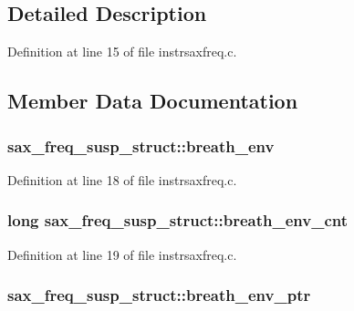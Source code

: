 \subsection{Detailed Description}


Definition at line 15 of file instrsaxfreq.\+c.



\subsection{Member Data Documentation}
\subsubsection[{\texorpdfstring{breath\+\_\+env}{breath_env}}]{ sax\+\_\+freq\+\_\+susp\+\_\+struct\+::breath\+\_\+env}\hypertarget{structsax__freq__susp__struct_acbe3c1e550511f37ca0f232793f24891}{}\label{structsax__freq__susp__struct_acbe3c1e550511f37ca0f232793f24891}


Definition at line 18 of file instrsaxfreq.\+c.

\subsubsection[{\texorpdfstring{breath\+\_\+env\+\_\+cnt}{breath_env_cnt}}]{\setlength{\rightskip}{0pt plus 5cm}long sax\+\_\+freq\+\_\+susp\+\_\+struct\+::breath\+\_\+env\+\_\+cnt}\hypertarget{structsax__freq__susp__struct_afc34619519689e1c2b891757aaefd78f}{}\label{structsax__freq__susp__struct_afc34619519689e1c2b891757aaefd78f}


Definition at line 19 of file instrsaxfreq.\+c.

\subsubsection[{\texorpdfstring{breath\+\_\+env\+\_\+ptr}{breath_env_ptr}}]{ sax\+\_\+freq\+\_\+susp\+\_\+struct\+::breath\+\_\+env\+\_\+ptr}\hypertarget{structsax__freq__susp__struct_a8f1ac1b67ade93158f812fe4c5cde6d9}{}\label{structsax__freq__susp__struct_a8f1ac1b67ade93158f812fe4c5cde6d9}


